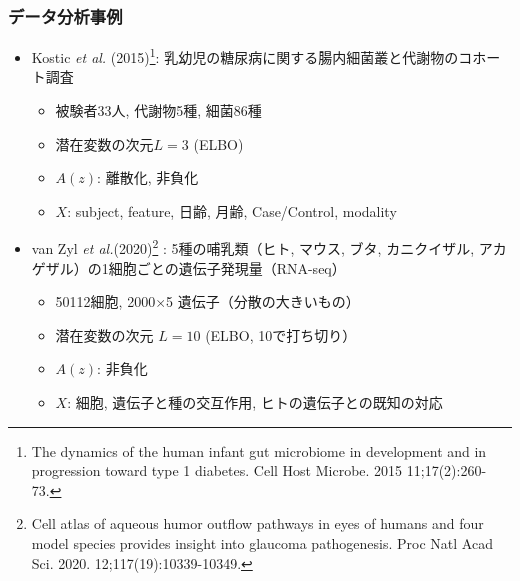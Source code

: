 \documentclass[dvipdfmx, dvipsnames]{beamer}
\begin{document}

\begin{frame}
\frametitle{データ分析事例}
\begin{itemize}
\item Kostic \textit{et al.} (2015)\footnote{The dynamics of the human infant gut microbiome in development and in progression toward type 1 diabetes. Cell Host Microbe. 2015 11;17(2):260-73.}: 乳幼児の糖尿病に関する腸内細菌叢と代謝物のコホート調査
\begin{itemize}
\item 被験者33人, 代謝物5種, 細菌86種
\item 潜在変数の次元$L=3$ (ELBO)
\item $A(z)$: 離散化, 非負化
\item $X$: subject, feature, 日齢, 月齢, Case/Control, modality
\end{itemize}
\item van Zyl \textit{et al.}(2020)\footnote{Cell atlas of aqueous humor outflow pathways in eyes of humans and four model species provides insight into glaucoma pathogenesis. Proc Natl Acad Sci. 2020. 12;117(19):10339-10349.} : 5種の哺乳類（ヒト, マウス, ブタ, カニクイザル, アカゲザル）の1細胞ごとの遺伝子発現量（RNA-seq）
\begin{itemize}
\item 50112細胞, 2000$\times$5 遺伝子（分散の大きいもの）
\item 潜在変数の次元 $L=10$  (ELBO, 10で打ち切り）
\item $A(z)$: 非負化
\item $X$: 細胞, 遺伝子と種の交互作用, ヒトの遺伝子との既知の対応
\end{itemize}
\end{itemize}
\end{frame}
\end{document}
